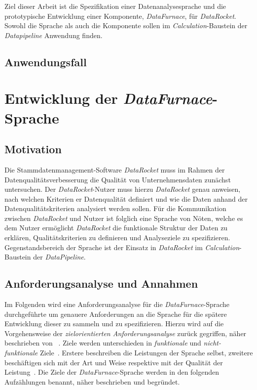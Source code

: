 \documentclass[
  language=german, %
  type=bachelor%
]{isthesis}
\begin{document}
\begin{content}
  Ziel dieser Arbeit ist die Spezifikation einer Datenanalysesprache und die
  prototypische Entwicklung einer Komponente, \textit{DataFurnace}, für
  \textit{DataRocket}. Sowohl die Sprache als auch die Komponente sollen im
  \textit{Calculation}-Baustein der \textit{Datapipeline} Anwendung finden.

  \section{Anwendungsfall}

  \chapter{Entwicklung der \textit{DataFurnace}-Sprache}


  \section{Motivation}
  Die Stammdatenmanagement-Software \textit{DataRocket} muss im Rahmen der
  Datenqualitätsverbesserung die Qualität von Unternehmensdaten zunächst untersuchen. Der
  \textit{DataRocket}-Nutzer muss hierzu \textit{DataRocket} genau anweisen,
  nach welchen Kriterien er Datenqualität definiert und wie die Daten anhand
  der Datenqualitätskriterien analysiert werden sollen. Für die Kommunikation
  zwischen \textit{DataRocket} und Nutzer ist folglich eine Sprache von Nöten,
  welche es dem Nutzer ermöglicht \textit{DataRocket} die funktionale Struktur
  der Daten zu erklären, Qualitätskriterien zu definieren und Analyseziele zu
  spezifizieren. Gegenstandsbereich der Sprache ist der Einsatz in
  \textit{DataRocket} im \textit{Calculation}-Baustein der
  \textit{DataPipeline}.

  \section{Anforderungsanalyse und Annahmen}\label{sec:sprache/anforderungsanalyse}
  Im Folgenden wird eine Anforderungsanalyse für die
  \textit{DataFurnace}-Sprache durchgeführte um genauere Anforderungen an die
  Sprache für die spätere Entwicklung dieser zu sammeln und zu spezifizieren.
  Hierzu wird auf die Vorgehensweise der \textit{zielorientierten
  Anforderungsanalyse} zurück gegriffen, näher beschrieben von
  \textsc{\citeauthor{van2001goal}}~\citeyearpar{van2001goal}.
  Ziele werden unterschieden in \textit{funktionale} und
  \textit{nicht-funktionale} Ziele~\cite[][S.  36]{mylopoulos1999object}.
  Erstere beschreiben die Leistungen der Sprache selbst, zweitere beschäftigen
  sich mit der Art und Weise respektive mit der Qualität der Leistung~\cite[][S.
  250]{van2001goal}. Die Ziele der \textit{DataFurnace}-Sprache werden in den
  folgenden Aufzählungen benannt, näher beschrieben und begründet.


\end{content}
\end{document}

